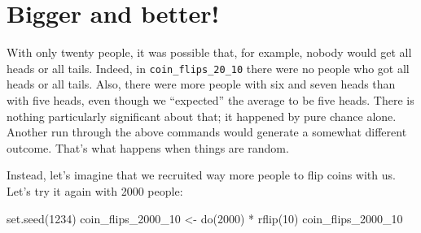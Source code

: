 \documentclass[
]{book}
\newenvironment{Shaded}{\begin{snugshade}}{\end{snugshade}}
\newcommand{\DecValTok}[1]{\textcolor[rgb]{0.00,0.00,0.81}{#1}}
\newcommand{\FunctionTok}[1]{\textcolor[rgb]{0.00,0.00,0.00}{#1}}
\newcommand{\NormalTok}[1]{#1}
\newcommand{\OtherTok}[1]{\textcolor[rgb]{0.56,0.35,0.01}{#1}}
\newcommand{\SpecialCharTok}[1]{\textcolor[rgb]{0.00,0.00,0.00}{#1}}
\begin{document}
\hypertarget{randomization1-bigger}{%
\section{Bigger and better!}\label{randomization1-bigger}}

With only twenty people, it was possible that, for example, nobody would get all heads or all tails. Indeed, in \texttt{coin\_flips\_20\_10} there were no people who got all heads or all tails. Also, there were more people with six and seven heads than with five heads, even though we ``expected'' the average to be five heads. There is nothing particularly significant about that; it happened by pure chance alone. Another run through the above commands would generate a somewhat different outcome. That's what happens when things are random.

Instead, let's imagine that we recruited way more people to flip coins with us. Let's try it again with 2000 people:

\begin{Shaded}
\begin{Highlighting}[]
\FunctionTok{set.seed}\NormalTok{(}\DecValTok{1234}\NormalTok{)}
\NormalTok{coin\_flips\_2000\_10 }\OtherTok{\textless{}{-}} \FunctionTok{do}\NormalTok{(}\DecValTok{2000}\NormalTok{) }\SpecialCharTok{*} \FunctionTok{rflip}\NormalTok{(}\DecValTok{10}\NormalTok{)}
\NormalTok{coin\_flips\_2000\_10}
\end{Highlighting}
\end{Shaded}
\end{document}
